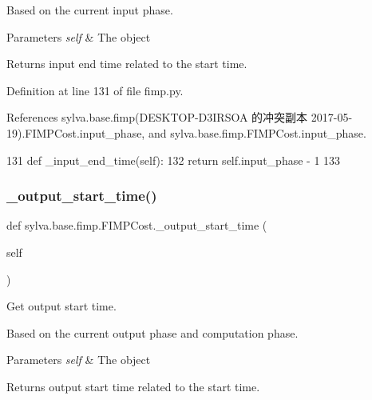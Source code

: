 Based on the current input phase.


\begin{DoxyParams}{Parameters}
{\em self} & The object\\
\hline
\end{DoxyParams}
\begin{DoxyReturn}{Returns}
input end time related to the start time. 
\end{DoxyReturn}


Definition at line 131 of file fimp.\+py.



References sylva.\+base.\+fimp(\+D\+E\+S\+K\+T\+O\+P-\/\+D3\+I\+R\+S\+O\+A 的冲突副本 2017-\/05-\/19).\+F\+I\+M\+P\+Cost.\+input\+\_\+phase, and sylva.\+base.\+fimp.\+F\+I\+M\+P\+Cost.\+input\+\_\+phase.


\begin{DoxyCode}
131     \textcolor{keyword}{def }\_input\_end\_time(self):
132         \textcolor{keywordflow}{return} self.input\_phase - 1
133 
\end{DoxyCode}
\mbox{\label{classsylva_1_1base_1_1fimp_1_1_f_i_m_p_cost_a162a87e8f45b84a27b8c7e2503539122}} 
\subsubsection{\texorpdfstring{\+\_\+output\+\_\+start\+\_\+time()}{\_output\_start\_time()}}
{\footnotesize\ttfamily def sylva.\+base.\+fimp.\+F\+I\+M\+P\+Cost.\+\_\+output\+\_\+start\+\_\+time (\begin{DoxyParamCaption}\item[{}]{self }\end{DoxyParamCaption})\hspace{0.3cm}{\ttfamily [private]}}



Get output start time. 

Based on the current output phase and computation phase.


\begin{DoxyParams}{Parameters}
{\em self} & The object\\
\hline
\end{DoxyParams}
\begin{DoxyReturn}{Returns}
output start time related to the start time. 
\end{DoxyReturn}


